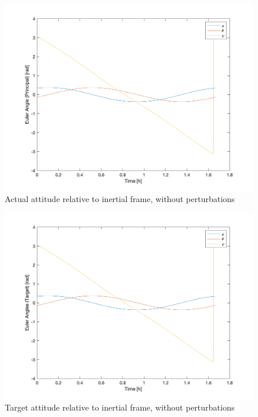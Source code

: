 \begin{figure}[H]
\centering
\includegraphics[scale=0.6]{Images/ps6_problem2_principal.png}
\caption{Actual attitude relative to inertial frame, without perturbations}
\label{fig:Images/ps6_problem2_principal}
\end{figure}

\begin{figure}[H]
\centering
\includegraphics[scale=0.6]{Images/ps6_problem2_target.png}
\caption{Target attitude relative to inertial frame, without perturbations}
\label{fig:Images/ps6_problem2_target}
\end{figure}

